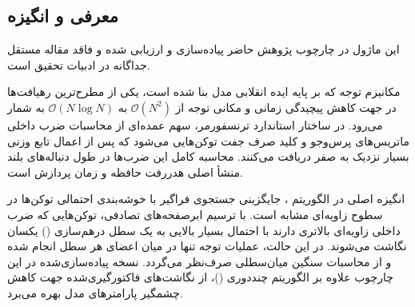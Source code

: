 \subsection{معرفی و انگیزه}
این ماژول در چارچوب پژوهش حاضر پیاده‌سازی و ارزیابی شده و فاقد مقاله مستقل جداگانه در ادبیات تحقیق است.

مکانیزم توجه  که بر پایه ایده انقلابی مدل  بنا شده است، یکی از مطرح‌ترین رهیافت‌ها در جهت کاهش پیچیدگی زمانی و مکانی توجه از $\mathcal{O}(N^2)$ به $\mathcal{O}(N \log N)$ به شمار می‌رود. در ساختار استاندارد ترنسفورمر، سهم عمده‌ای از محاسبات ضرب داخلی ماتریس‌های پرس‌وجو و کلید صرف جفت توکن‌هایی می‌شود که پس از اعمال تابع  وزنی بسیار نزدیک به صفر دریافت می‌کنند. محاسبه کامل این ضرب‌ها در طول دنباله‌های بلند منشأ اصلی هدررفت حافظه و زمان پردازش است.

انگیزه اصلی در الگوریتم ، جایگزینی جستجوی فراگیر با خوشه‌بندی احتمالی توکن‌ها در سطوح زاویه‌ای مشابه است. با ترسیم ابرصفحه‌های تصادفی، توکن‌هایی که ضرب داخلی زاویه‌ای بالاتری دارند با احتمال بسیار بالایی به یک سطل درهم‌سازی () یکسان نگاشت می‌شوند. در این حالت، عملیات توجه تنها در میان اعضای هر سطل انجام شده و از محاسبات سنگین میان‌سطلی صرف‌نظر می‌گردد. نسخه پیاده‌سازی‌شده در این چارچوب علاوه بر الگوریتم چنددوری ()، از نگاشت‌های فاکتورگیری‌شده  جهت کاهش چشمگیر پارامترهای مدل بهره می‌برد.
